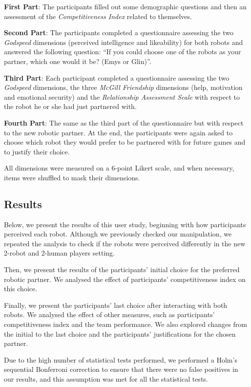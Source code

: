\textbf{First Part}: The participants filled out some demographic questions and then an assessment of the \textit{Competitiveness Index} related to themselves.

\textbf{Second Part}: The participants completed a questionnaire assessing the two \textit{Godspeed} dimensions (perceived intelligence and likeability) for both robots and answered the following question: ``If you could choose one of the robots as your partner, which one would it be? (Emys or Glin)''.

\textbf{Third Part}: Each participant completed a questionnaire assessing the two \textit{Godspeed} dimensions, the three \textit{McGill Friendship} dimensions (help, motivation and emotional security) and the \textit{Relationship Assessment Scale} with respect to the robot he or she had just partnered with.

\textbf{Fourth Part}: The same as the third part of the questionnaire but with respect to the new robotic partner. At the end, the participants were again asked to choose which robot they would prefer to be partnered with for future games and to justify their choice.

All dimensions were measured on a 6-point Likert scale, and when necessary, items were shuffled to mask their dimensions.

\subsection{Results}
Below, we present the results of this user study, beginning with how participants perceived each robot. Although we previously checked our manipulation, we repeated the analysis to check if the robots were perceived differently in the new 2-robot and 2-human players setting.

Then, we present the results of the participants' initial choice for the preferred robotic partner. We analysed the effect of participants' competitiveness index on this choice.

Finally, we present the participants' last choice after interacting with both robots. We analysed the effect of other measures, such as participants' competitiveness index and the team performance. We also explored changes from the initial to the last choice and the participants' justifications for the chosen partner.

Due to the high number of statistical tests performed, we performed a Holm's sequential Bonferroni correction \cite{holm1979simple} to ensure that there were no false positives in our results, and this assumption was met for all the statistical tests.




